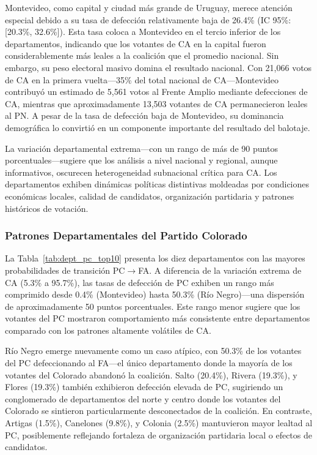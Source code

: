 Montevideo, como capital y ciudad más grande de Uruguay, merece atención especial debido a su tasa de defección relativamente baja de 26.4\% (IC 95\%: [20.3\%, 32.6\%]). Esta tasa coloca a Montevideo en el tercio inferior de los departamentos, indicando que los votantes de CA en la capital fueron considerablemente más leales a la coalición que el promedio nacional. Sin embargo, su peso electoral masivo domina el resultado nacional. Con 21,066 votos de CA en la primera vuelta---35\% del total nacional de CA---Montevideo contribuyó un estimado de 5,561 votos al Frente Amplio mediante defecciones de CA, mientras que aproximadamente 13,503 votantes de CA permanecieron leales al PN. A pesar de la tasa de defección baja de Montevideo, su dominancia demográfica lo convirtió en un componente importante del resultado del balotaje.

La variación departamental extrema---con un rango de más de 90 puntos porcentuales---sugiere que los análisis a nivel nacional y regional, aunque informativos, oscurecen heterogeneidad subnacional crítica para CA. Los departamentos exhiben dinámicas políticas distintivas moldeadas por condiciones económicas locales, calidad de candidatos, organización partidaria y patrones históricos de votación.

\subsubsection{Patrones Departamentales del Partido Colorado}

La Tabla~\ref{tab:dept_pc_top10} presenta los diez departamentos con las mayores probabilidades de transición PC$\to$FA. A diferencia de la variación extrema de CA (5.3\% a 95.7\%), las tasas de defección de PC exhiben un rango más comprimido desde 0.4\% (Montevideo) hasta 50.3\% (Río Negro)---una dispersión de aproximadamente 50 puntos porcentuales. Este rango menor sugiere que los votantes del PC mostraron comportamiento más consistente entre departamentos comparado con los patrones altamente volátiles de CA.



Río Negro emerge nuevamente como un caso atípico, con 50.3\% de los votantes del PC defeccionando al FA---el único departamento donde la mayoría de los votantes del Colorado abandonó la coalición. Salto (20.4\%), Rivera (19.3\%), y Flores (19.3\%) también exhibieron defección elevada de PC, sugiriendo un conglomerado de departamentos del norte y centro donde los votantes del Colorado se sintieron particularmente desconectados de la coalición. En contraste, Artigas (1.5\%), Canelones (9.8\%), y Colonia (2.5\%) mantuvieron mayor lealtad al PC, posiblemente reflejando fortaleza de organización partidaria local o efectos de candidatos.

